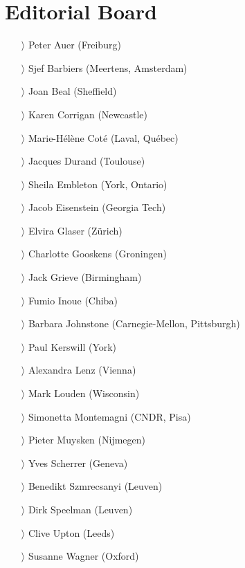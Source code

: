 \documentclass[
notumble,
nofoldmark,
]{leaflet}
\begin{document}
{    \section{Editorial Board}   
    \begin{itemize}
    \item[$\rangle$] Peter Auer (Freiburg)
    \item[$\rangle$] Sjef Barbiers (Meertens, Amsterdam)
    \item[$\rangle$] Joan Beal (Sheffield)
    \item[$\rangle$] Karen Corrigan (Newcastle)
    \item[$\rangle$] Marie-Hélène Cot\'e (Laval, Qu\'ebec)
    \item[$\rangle$] Jacques Durand (Toulouse)
    \item[$\rangle$] Sheila Embleton (York, Ontario)
    \item[$\rangle$] Jacob Eisenstein (Georgia Tech)
    \item[$\rangle$] Elvira Glaser (Z\"urich)
    \item[$\rangle$] Charlotte Gooskens (Groningen)
    \item[$\rangle$] Jack Grieve (Birmingham)
    \item[$\rangle$] Fumio Inoue (Chiba)
    \item[$\rangle$] Barbara Johnstone (Carnegie-Mellon, Pittsburgh)
    \item[$\rangle$] Paul Kerswill (York)
    \item[$\rangle$] Alexandra Lenz (Vienna)
    \item[$\rangle$] Mark Louden (Wisconsin)
    \item[$\rangle$] Simonetta Montemagni (CNDR, Pisa)
    \item[$\rangle$] Pieter Muysken (Nijmegen)
    \item[$\rangle$] Yves Scherrer (Geneva)
    \item[$\rangle$] Benedikt Szmrecsanyi (Leuven)
    \item[$\rangle$] Dirk Speelman (Leuven)
    \item[$\rangle$] Clive Upton (Leeds)
    \item[$\rangle$] Susanne Wagner (Oxford)
    \end{itemize}
    }
\end{document}
